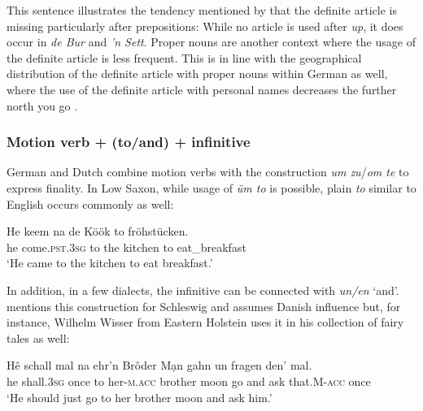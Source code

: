\documentclass[output=paper,colorlinks,citecolor=brown]{langscibook}
\begin{document}
This sentence illustrates the tendency mentioned by \citet[147]{Pheiff2022} that the definite article is missing particularly after prepositions: While no article is used after \textit{up}, it does occur in \textit{de Bur} and \textit{'n Sett}. Proper nouns are another context where the usage of the definite article is less frequent. This is in line with the geographical distribution  of the definite article with proper nouns within German as well, where the use of the definite article with personal names decreases the further north you go \citep[150]{Pheiff2022}.

\subsubsection{Motion verb + (to/and) + infinitive}\label{to-infinitive}\label{feature:um-to}
German and Dutch combine motion verbs with the construction \textit{um zu}\slash\textit{om te} to express finality. In Low Saxon, while usage of \textit{üm to} is possible, plain \textit{to} similar to English occurs commonly as well:

\ea
\gll He    keem   na  de   Köök   to  fröhstücken. \\
     he          come.\textsc{pst}.\textsc{3sg}  to  the   kitchen  to   eat\_breakfast \\
\glt `He came to the kitchen to eat breakfast.' \citep[74]{Thies2010}
\z

In addition, in a few dialects, the infinitive can be connected with \textit{un/en} `and'. \citet[76]{Thies2010} mentions this construction for Schleswig and assumes Danish influence but, for instance, Wilhelm Wisser from Eastern Holstein uses it in his collection of fairy tales as well: %

\ea
 \gll Hê    schall   mal    na ehr'n   Brôder M\d{a}n gahn un fragen den' mal. \\
     he      shall.\textsc{3sg}  once  to  her-\textsc{m}.\textsc{acc}   brother  moon  go    and   ask    that.\textsc{M}-\textsc{acc}   once \\
\glt `He should just go to her brother moon and ask him.' \citep[53]{Wisser1921}
\z
\end{document}
